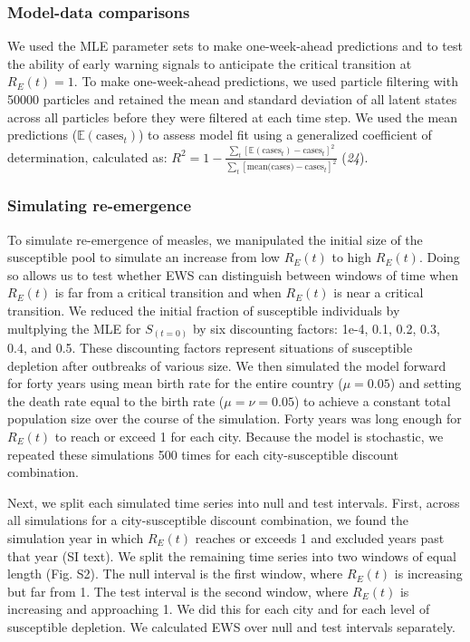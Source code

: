 \documentclass[3p]{elsarticle} %
\begin{document}
\subsubsection{Model-data comparisons}\label{model-data-comparisons}

We used the MLE parameter sets to make one-week-ahead predictions and to
test the ability of early warning signals to anticipate the critical
transition at \(R_E(t) = 1\). To make one-week-ahead predictions, we
used particle filtering with 50000 particles and retained the mean and
standard deviation of all latent states across all particles before they
were filtered at each time step. We used the mean predictions
(\(\mathbb{E}(\text{cases}_t)\)) to assess model fit using a generalized
coefficient of determination, calculated as:
\(R^2 = 1 - \frac{\sum_t [\mathbb{E}(\text{cases}_t) - \text{cases}_t]^2}{\sum_t [\text{mean(cases)}-\text{cases}_t]^2}\)
(\emph{24}).

\subsubsection{Simulating re-emergence}\label{simulating-re-emergence}

To simulate re-emergence of measles, we manipulated the initial size of
the susceptible pool to simulate an increase from low \(R_E(t)\) to high
\(R_E(t)\). Doing so allows us to test whether EWS can distinguish
between windows of time when \(R_E(t)\) is far from a critical
transition and when \(R_E(t)\) is near a critical transition. We reduced
the initial fraction of susceptible individuals by multplying the MLE
for \(S_{(t=0)}\) by six discounting factors: 1e-4, 0.1, 0.2, 0.3, 0.4,
and 0.5. These discounting factors represent situations of susceptible
depletion after outbreaks of various size. We then simulated the model
forward for forty years using mean birth rate for the entire country
(\(\mu = 0.05\)) and setting the death rate equal to the birth rate
(\(\mu = \nu = 0.05\)) to achieve a constant total population size over
the course of the simulation. Forty years was long enough for \(R_E(t)\)
to reach or exceed 1 for each city. Because the model is stochastic, we
repeated these simulations 500 times for each city-susceptible discount
combination.

Next, we split each simulated time series into null and test intervals.
First, across all simulations for a city-susceptible discount
combination, we found the simulation year in which \(R_E(t)\) reaches or
exceeds 1 and excluded years past that year (SI text). We split the
remaining time series into two windows of equal length (Fig. S2). The
null interval is the first window, where \(R_E(t)\) is increasing but
far from 1. The test interval is the second window, where \(R_E(t)\) is
increasing and approaching 1. We did this for each city and for each
level of susceptible depletion. We calculated EWS over null and test
intervals separately.
\end{document}
